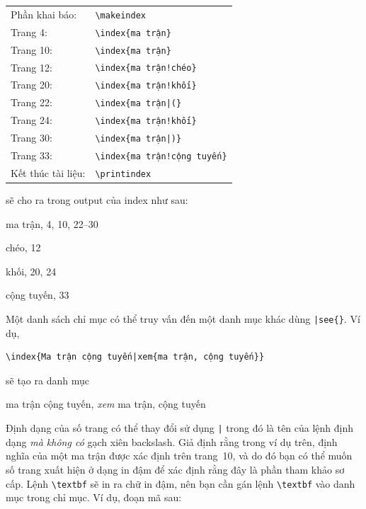 \documentclass[a4paper]{report}
\begin{document}
\begin{center}
\begin{tabular}{ll}
Phần khai báo: & \verb|\makeindex|\\ 
Trang 4: & \verb|\index{ma trận}|\\
Trang 10: & \verb|\index{ma trận}|\\
Trang 12: & \verb|\index{ma trận!chéo}|\\
Trang 20: & \verb|\index{ma trận!khối}|\\
Trang 22: & \verb"\index{ma trận|(}"\\
Trang 24: & \verb|\index{ma trận!khối}|\\
Trang 30: & \verb"\index{ma trận|)}"\\
Trang 33: & \verb|\index{ma trận!cộng tuyến}|\\
Kết thúc tài liệu: & \verb|\printindex|
\end{tabular}
\end{center}
sẽ cho ra trong output của index như sau:
\begin{description}
\item ma trận, 4, 10, 22--30
\begin{description}
\item chéo, 12
\item khối, 20, 24
\item cộng tuyến, 33
\end{description}
\end{description}
Một danh sách chỉ mục có thể truy vấn đến một danh mục khác dùng  \verb"|see{"\verb"}".  Ví dụ,
\begin{verbatim}
\index{Ma trận cộng tuyến|xem{ma trận, cộng tuyến}}
\end{verbatim}
sẽ tạo ra danh mục
\begin{description}
\item ma trận cộng tuyến, \textit{xem} ma trận, cộng tuyến
\end{description}
Định dạng của số trang có thể thay đổi sử dụng \verb"|" trong đó  là tên của lệnh định dạng \emph{mà không có} gạch xiên {backslash}. Giả định rằng trong ví dụ trên, định nghĩa của một ma trận được xác định trên trang~10, và do đó bạn có thể muốn số trang xuất hiện ở dạng in đậm để xác định rằng đây là phần tham khảo sơ cấp. Lệnh \verb|\textbf| sẽ in ra chữ in đậm, nên bạn cần gán lệnh \verb|\textbf| vào danh mục trong chỉ mục. Ví dụ, đoạn mã sau:
\end{document}
